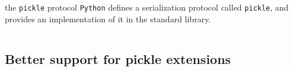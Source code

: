 \documentclass[13pt, usenames,dvipsnames]{beamer} %
\newcommand{\mycode}[2][\tiny] {\texttt{#2}}
\begin{document}
    \begin{frame}[t]{the \mycode[\small]{pickle} protocol}
        \vspace{2em}
        \footnotesize
        \mycode[\small]{Python} defines a serialization protocol called
        \mycode[\small]{pickle}, and provides an implementation of it in the
        standard library.

        \inputminted[bgcolor=beige, fontsize=\tiny]{python}{scripts/pickle_example.py}
    \end{frame}

\subsection{Better support for pickle extensions}
\end{document}
